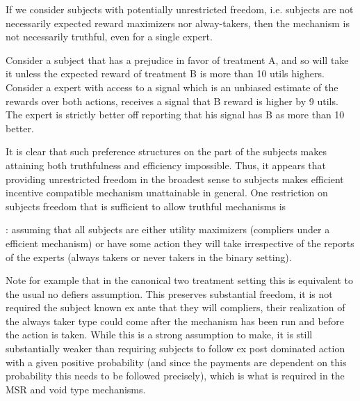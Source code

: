 If we consider subjects with potentially unrestricted freedom, i.e. subjects are not necessarily expected reward maximizers nor alway-takers, then the mechanism is not necessarily truthful, even for a single expert. 

\begin{eg}
	Consider a subject that has a prejudice in favor of treatment A, and so will take it unless the expected reward of treatment B is more than 10 utils highers. Consider a expert with access to a signal which is an unbiased estimate of the rewards over both actions, receives a signal  that B reward is higher by 9 utils. The expert is strictly better off reporting that his signal has B as more than 10 better.
\end{eg}



It is clear that such preference structures on the part of the subjects makes attaining both truthfulness and efficiency impossible. 
Thus, it appears that providing unrestricted freedom in the broadest sense to subjects makes efficient incentive compatible mechanism unattainable in general.
One restriction on subjects freedom that is sufficient to allow truthful mechanisms is 

\begin{defn}: assuming that all subjects are either utility maximizers (compliers under a efficient mechanism) or have some action they will take irrespective of the reports of the experts (always takers or never takers in the binary setting). 
\end{defn}

Note for example that in the canonical two treatment setting this is equivalent to the usual no defiers assumption.
This preserves substantial freedom, it is not required the subject known ex ante that they will compliers, their realization of the always taker type could come after the mechanism has been run and before the action is taken. 
While this is a strong assumption to make, it is still substantially weaker than requiring subjects to follow ex post dominated action with a given positive probability (and since the payments are dependent on this probability this needs to be followed precisely), which is what is required in the MSR and void type mechanisms.


